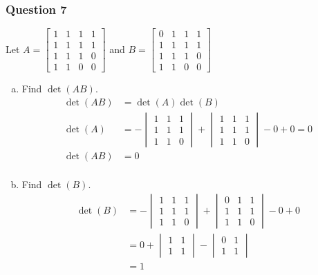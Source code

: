 \documentclass{math}
\begin{document}
\subsubsection*{Question 7}
Let \( A = \begin{bmatrix}
  1 & 1 & 1 & 1 \\
  1 & 1 & 1 & 1 \\
  1 & 1 & 1 & 0 \\
  1 & 1 & 0 & 0
\end{bmatrix} \) and \( B = \begin{bmatrix}
  0 & 1 & 1 & 1 \\
  1 & 1 & 1 & 1 \\
  1 & 1 & 1 & 0 \\
  1 & 1 & 0 & 0
\end{bmatrix} \)
\begin{enumerate}[(a)]
  \item Find \( \det(AB) \).
  \begin{align*}
    \det(AB) &= \det(A)\det(B) \\
    \det(A) &= -\begin{vmatrix}
      1 & 1 & 1 \\
      1 & 1 & 1 \\
      1 & 1 & 0
    \end{vmatrix}+\begin{vmatrix}
      1 & 1 & 1 \\
      1 & 1 & 1 \\
      1 & 1 & 0
    \end{vmatrix}-0+0 = 0 \\
    \det(AB) &= 0 \\
  \end{align*}
  \item Find \( \det(B) \).
  \begin{align*}
    \det(B) &= -\begin{vmatrix}
      1 & 1 & 1 \\
      1 & 1 & 1 \\
      1 & 1 & 0
    \end{vmatrix}+\begin{vmatrix}
      0 & 1 & 1 \\
      1 & 1 & 1 \\
      1 & 1 & 0
    \end{vmatrix}-0+0 \\
    &= 0+\begin{vmatrix}
      1 & 1 \\ 1 & 1
    \end{vmatrix}-\begin{vmatrix}
      0 & 1 \\ 1 & 1
    \end{vmatrix} \\
    &= 1
  \end{align*}
\end{enumerate}
\end{document}
